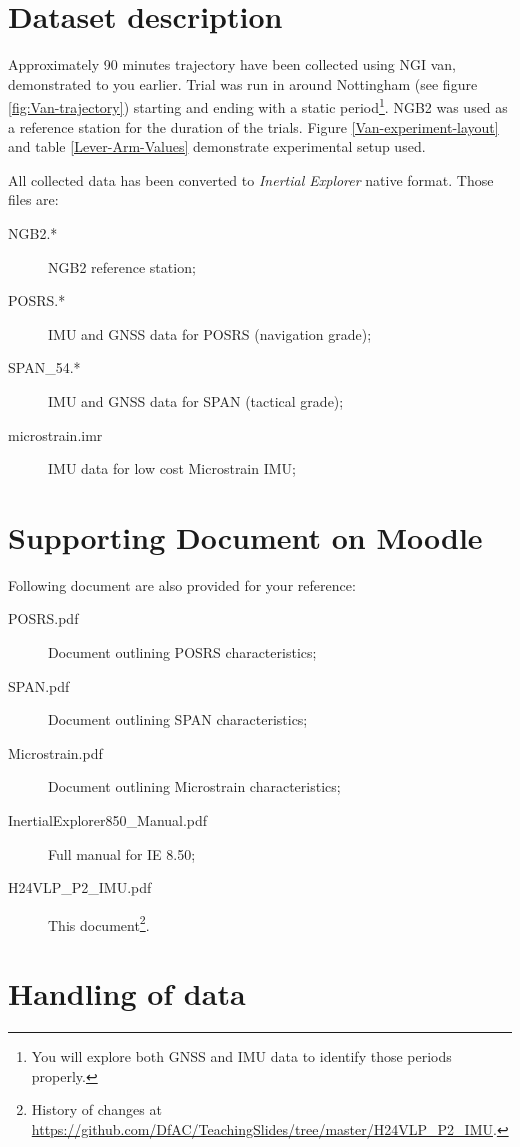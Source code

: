\documentclass[british]{book}
\newcommand{\thisDocRef}{\footnote{History of changes at \url{https://github.com/DfAC/TeachingSlides/tree/master/H24VLP_P2_IMU}.}}
\begin{document}
\section{Dataset description}

Approximately 90 minutes trajectory have been collected using NGI van, demonstrated to you earlier. Trial was run in around Nottingham (see figure \ref{fig:Van-trajectory}) starting and ending with a static period\footnote{You will explore both GNSS and IMU data to identify those periods properly.}. NGB2 was used as a reference station for the duration of the trials.
Figure \ref{Van-experiment-layout} and table \ref{Lever-Arm-Values} demonstrate experimental setup used.

All collected data has been converted to \emph{Inertial Explorer} native format. Those files are:
	\begin{description}
	\item [{NGB2.{*}}] NGB2 reference station;
	\item [{POSRS.{*}}] IMU and GNSS data for POSRS (navigation grade);
	\item [{SPAN\_54.{*}}] IMU and GNSS data for SPAN (tactical grade);
	\item [{microstrain.imr}] IMU data for low cost Microstrain IMU;
	\end{description}


\section{Supporting Document on Moodle}

Following document are also provided for your reference:

	\begin{description}
	\item [{POSRS.pdf}] Document outlining POSRS characteristics;
	\item [{SPAN.pdf}] Document outlining SPAN characteristics;
	\item [{Microstrain.pdf}] Document outlining Microstrain characteristics;
	\item [{InertialExplorer850\_Manual.pdf}] Full manual for IE 8.50;
	\item [{H24VLP\_P2\_IMU.pdf}] This document\thisDocRef.
	\end{description}

\section{Handling of data}
\end{document}
